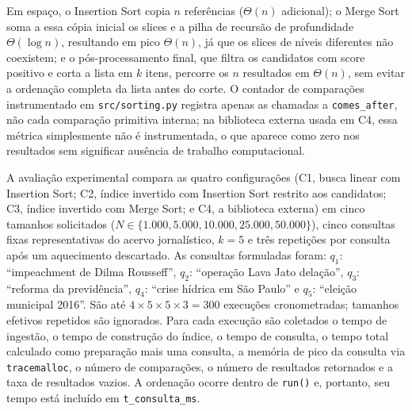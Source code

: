 \documentclass[12pt, a4paper]{article}
\begin{document}
Em espaço, o Insertion Sort copia $n$ referências ($\Theta(n)$ adicional); o Merge Sort soma a essa cópia inicial os slices e a pilha de recursão de profundidade $\Theta(\log n)$, resultando em pico $\Theta(n)$, já que os slices de níveis diferentes não coexistem; e o pós-processamento final, que filtra os candidatos com score positivo e corta a lista em $k$ itens, percorre os $n$ resultados em $\Theta(n)$, sem evitar a ordenação completa da lista antes do corte. O contador de comparações instrumentado em \texttt{src/sorting.py} registra apenas as chamadas a \texttt{comes\_after}, não cada comparação primitiva interna; na biblioteca externa usada em C4, essa métrica simplesmente não é instrumentada, o que aparece como zero nos resultados sem significar ausência de trabalho computacional.

A avaliação experimental compara as quatro configurações (C1, busca linear com Insertion Sort; C2, índice invertido com Insertion Sort restrito aos candidatos; C3, índice invertido com Merge Sort; e C4, a biblioteca externa) em cinco tamanhos solicitados ($N \in \{1.000, 5.000, 10.000, 25.000, 50.000\}$), cinco consultas fixas representativas do acervo jornalístico, $k=5$ e três repetições por consulta após um aquecimento descartado. As consultas formuladas foram: $q_1$: ``impeachment de Dilma Rousseff'', $q_2$: ``operação Lava Jato delação'', $q_3$: ``reforma da previdência'', $q_4$: ``crise hídrica em São Paulo'' e $q_5$: ``eleição municipal 2016''. São até $4 \times 5 \times 5 \times 3 = 300$ execuções cronometradas; tamanhos efetivos repetidos são ignorados. Para cada execução são coletados o tempo de ingestão, o tempo de construção do índice, o tempo de consulta, o tempo total calculado como preparação mais uma consulta, a memória de pico da consulta via \texttt{tracemalloc}, o número de comparações, o número de resultados retornados e a taxa de resultados vazios. A ordenação ocorre dentro de \texttt{run()} e, portanto, seu tempo está incluído em \texttt{t\_consulta\_ms}.
\end{document}
